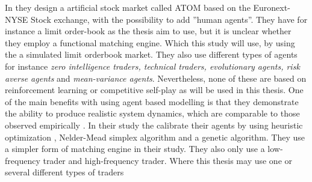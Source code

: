 \documentclass{kththesis}
\theoremstyle{definition}
\begin{document}
In \textcite{brandouy2011design} they design a artificial stock market called ATOM based on the Euronext-NYSE Stock exchange, with the possibility to add ''human agents''. They have for instance a limit order-book as the thesis aim to use, but it is unclear whether they employ a functional matching engine. Which this study will use, by using the a simulated limit orderbook market. They also use different types of agents for instance \textit{zero intelligence traders, technical traders, evolutionary agents, risk averse agents} and \textit{mean-variance agents}. 
\newline
\newline
Nevertheless, none of these are based on reinforcement learning or competitive self-play as will be used in this thesis. One of the main benefits with using agent based modelling is that they demonstrate the ability to produce realistic system dynamics, which are comparable to those observed empirically \parencite{platt2016problem}. In their study the calibrate their agents by using heuristic optimization , Nelder-Mead simplex algorithm and a genetic algorithm. They use a simpler form of matching engine in their study. They also only use a low-frequency trader and high-frequency trader. Where this thesis may use one or several different types of traders
\end{document}
